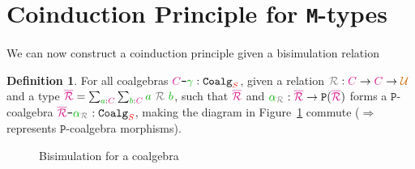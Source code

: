 \documentclass[twoside,11pt,openright]{report}
\theoremstyle{plain} %
\theoremstyle{definition}
\newtheorem{defn}{Definition}[section]
\theoremstyle{remark}
\newcommand*{\figref}[1]{Figure~\ref{fig:#1}}
\newcommand*{\term}[1]{\textcolor{green!70!black}{#1}} %
\newcommand*{\type}[1]{\textcolor{magenta!90!black}{#1}}
\newcommand*{\container}[1]{\textcolor{red}{#1}}
\newcommand*{\universe}[1]{\textcolor{orange!80!black}{#1}}
\newcommand*{\coalg}[2]{#1\texttt{-}#2}
\newcommand*{\relation}[1]{\textcolor{gray}{\ensuremath{\mathtt{#1}}}}
\newcommand*{\typeformer}[1]{\ensuremath{\mathtt{#1}}}
\newcommand*{\functor}[1]{\ensuremath{\mathbf{\mathtt{#1}}}}
\begin{document}
\section{Coinduction Principle for \texttt{M}-types}
We can now construct a coinduction principle given a bisimulation relation

\begin{defn}
  For all coalgebras \(\coalg{\type{C}}{\term{\gamma}} : \typeformer{Coalg}_{\container{S}}\), given a relation \(\relation{\mathcal{R}} : \type{C} \rightarrow \type{C} \rightarrow \universe{\mathcal{U}}\) and a type \(\type{\overline{\mathcal{R}}} = \sum_{\term{a} : \type{C}} \sum_{\term{b} : \type{C}} \term{a}~\relation{\mathcal{R}}~\term{b}\), such that \(\type{\overline{\mathcal{R}}}\) and \(\term{\alpha}_{\relation{\mathcal{R}}} : \type{\overline{\mathcal{R}}} \rightarrow \functor{P}(\type{\overline{\mathcal{R}}})\) forms a \(\functor{P}\)-coalgebra \(\coalg{\type{\overline{\mathcal{R}}}}{\term{\alpha}_{\relation{\mathcal{R}}}} : \mathtt{Coalg}_{\container{S}}\), making the diagram in \figref{coalgebra-coinduction-definition} commute (\(\Longrightarrow\) represents \(\functor{P}\)-coalgebra morphisms).  
  \begin{figure}[h]
    \centering
    \caption{Bisimulation for a coalgebra}
    \label{fig:coalgebra-coinduction-definition}
  \end{figure}
\end{defn}
\end{document}
